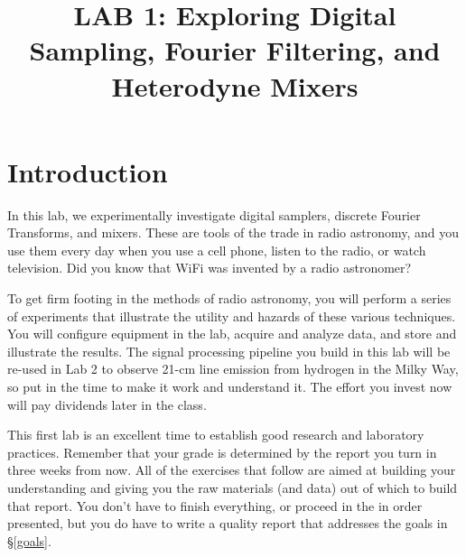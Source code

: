 \documentclass[11pt,preprint]{aastex}
\begin{document}
\def\simlt{\lower.5ex\hbox{$\; \buildrel < \over \sim \;$}}
\def\simgt{\lower.5ex\hbox{$\; \buildrel > \over \sim \;$}}
\def\wLO{\omega_0}

\title {LAB 1: Exploring Digital Sampling, Fourier Filtering, and Heterodyne Mixers}

\tableofcontents


\section{Introduction}

\noindent
In this lab, we experimentally investigate digital
samplers, discrete Fourier Transforms, and mixers. These are 
tools of the trade in radio astronomy, and
you use them every day when you use a cell phone, listen to the radio,
or watch television. Did you know that WiFi was invented by a radio
astronomer?

To get firm footing in the methods of radio astronomy, you will perform a series of
experiments that illustrate the utility and hazards of these various techniques. 
You will configure equipment in the lab, acquire and analyze data, and store and illustrate the results.
The signal processing pipeline you build in this lab will be re-used in Lab 2 to
observe 21-cm line emission from hydrogen in the Milky Way, so 
put in the time to make it work and understand it. The effort you
invest now will pay dividends later in the class.

This first lab is an excellent time to establish good research and laboratory practices.
Remember that your grade is determined by the report you turn in
three weeks from now. All of the exercises that follow are aimed at building your
understanding and giving you the raw materials (and data) out of which to build that report.
You don't have to finish everything, or proceed in the in order presented, but you do have
to write a quality report that addresses the goals in \S\ref{goals}.
\end{document}
